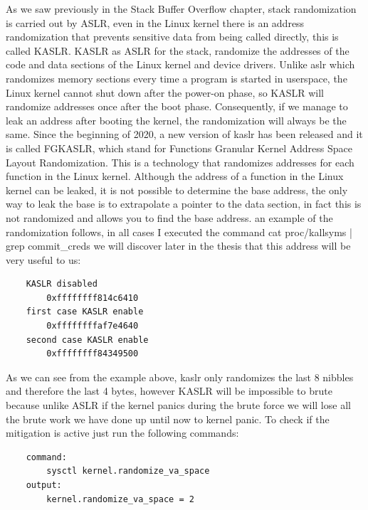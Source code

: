     As we saw previously in the Stack Buffer Overflow chapter, stack randomization is carried out by ASLR, even in the Linux kernel there is an address randomization that prevents sensitive data from being called directly, this is called KASLR. \newline
    KASLR as ASLR for the stack, randomize the addresses  of the code and data sections of the Linux kernel and device drivers.\newline
    Unlike aslr which randomizes memory sections every time a program is started in userspace, the Linux kernel cannot shut down after the power-on phase, so KASLR will randomize addresses once after the boot phase.\newline
    Consequently, if we manage to leak an address after booting the kernel, the randomization will always be the same.\newline
    Since the beginning of 2020, a new version of kaslr has been released and it is called FGKASLR, which stand for Functions Granular Kernel Address Space Layout Randomization.\newline 
    This is a technology that randomizes addresses for each function in the Linux kernel.\newline 
    Although the address of a function in the Linux kernel can be leaked, it is not possible to determine the base address, the only way to leak the base is to extrapolate a pointer to the data section, in fact this is not randomized and allows you to find the base address.\newline
    an example of the randomization follows, in all cases I executed the command cat proc/kallsyms | grep commit\_creds we will discover later in the thesis that this address will be very useful to us:\newline
    \begin{verbatim}
    KASLR disabled 
        0xffffffff814c6410
    first case KASLR enable  
        0xffffffffaf7e4640
    second case KASLR enable
        0xffffffff84349500
    \end{verbatim}
    As we can see from the example above, kaslr only randomizes the last 8 nibbles and therefore the last 4 bytes, however KASLR will be impossible to brute because unlike ASLR if the kernel panics during the brute force we will lose all the brute work we have done up until now to kernel panic.\newline
    To check if the mitigation is active just run the following commands: \newline
    \begin{verbatim}
    command:
        sysctl kernel.randomize_va_space                  
    output:
        kernel.randomize_va_space = 2

    \end{verbatim}
    \clearpage
